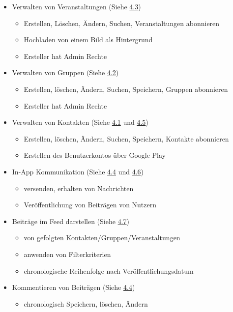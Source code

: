 \documentclass[parskip=full]{scrartcl}
\begin{document}
	\begin{itemize}
		\item Verwalten von Veranstaltungen (Siehe \hyperref[sec:FAVeranstaltungen]{4.3})
			\begin{itemize} 
				
				\item Erstellen, Löschen, Ändern, Suchen, Veranstaltungen abonnieren
				\item Hochladen von einem Bild als Hintergrund
				\item Ersteller hat Admin Rechte
			\end{itemize}
			
			\item Verwalten von Gruppen (Siehe \hyperref[sec:FAGruppen]{4.2})
				\begin{itemize}
					\item Erstellen, löschen, Ändern, Suchen, Speichern, Gruppen abonnieren
					\item Ersteller hat Admin Rechte
				\end{itemize}
			\item Verwalten von Kontakten (Siehe \hyperref[sec:FAFreunde]{4.1} und \hyperref[sec:FAKonto]{4.5}) 
				\begin{itemize}
					\item Erstellen, löschen, Ändern, Suchen, Speichern, Kontakte abonnieren
					\item Erstellen des Benutzerkontos über Google Play
				\end{itemize}
			\item In-App Kommunikation (Siehe \hyperref[sec:FABeiträge]{4.4} und \hyperref[sec:FANachrichten]{4.6}) 
			\begin{itemize}
				\item versenden, erhalten von Nachrichten
				\item Veröffentlichung von Beiträgen von Nutzern
			\end{itemize}
			\item Beiträge im \gls{Feed} darstellen (Siehe \hyperref[sec:FAFeed]{4.7}) 
				\begin{itemize}
					\item von gefolgten Kontakten/Gruppen/Veranstaltungen
					\item anwenden von Filterkriterien
					\item chronologische Reihenfolge nach Veröffentlichungsdatum
				\end{itemize}
			\item Kommentieren von Beiträgen (Siehe \hyperref[sec:FABeiträge]{4.4}) 
				\begin{itemize}
					\item chronologisch Speichern, löschen, Ändern
				\end{itemize}	
	\end{itemize}
	
\end{document}
